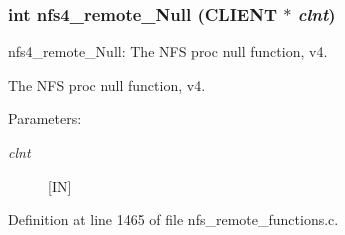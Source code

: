 \subsubsection{\setlength{\rightskip}{0pt plus 5cm}int nfs4\_\-remote\_\-Null (CLIENT $\ast$ {\em clnt})}\label{group__NFSprocs_ga41}


nfs4\_\-remote\_\-Null: The NFS proc null function, v4.

The NFS proc null function, v4.

\begin{Desc}
\item[Parameters:]
\begin{description}
\item[{\em clnt}][IN] \end{description}
\end{Desc}


Definition at line 1465 of file nfs\_\-remote\_\-functions.c.